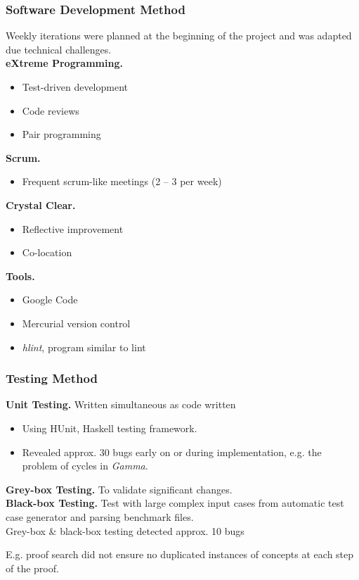 \begin{frame}
  \frametitle{Software Development Method}
Weekly iterations were planned at the beginning of the project and was adapted due technical challenges.\\
\smallskip
\textbf{eXtreme Programming.}
\begin{itemize}
\item Test-driven development
\item Code reviews
\item Pair programming
\end{itemize}

\textbf{Scrum.}
\begin{itemize}
\item Frequent scrum-like meetings (2 -- 3 per week)
\end{itemize}

\textbf{Crystal Clear.}
\begin{itemize}
\item Reflective improvement
\item Co-location
\end{itemize}

\textbf{Tools.}
\begin{itemize}
\item Google Code
\item Mercurial version control
\item \textit{hlint}, program similar to lint
\end{itemize}
\end{frame}


\begin{frame}
  \frametitle{Testing Method}
\textbf{Unit Testing.} Written simultaneous as code written
\begin{itemize}
\item Using HUnit, Haskell testing framework.
\item Revealed approx. 30 bugs early on or during implementation, e.g. the problem of cycles in \textit{Gamma}.
\end{itemize}
\bigskip
\textbf{Grey-box Testing.} To validate significant changes.\\
\bigskip
\textbf{Black-box Testing.} Test with large complex input cases from automatic test case generator and parsing benchmark files.\\
\bigskip
Grey-box \& black-box testing detected approx. 10 bugs

E.g. proof search did not ensure no duplicated instances of concepts at each step of the proof.
\end{frame}

